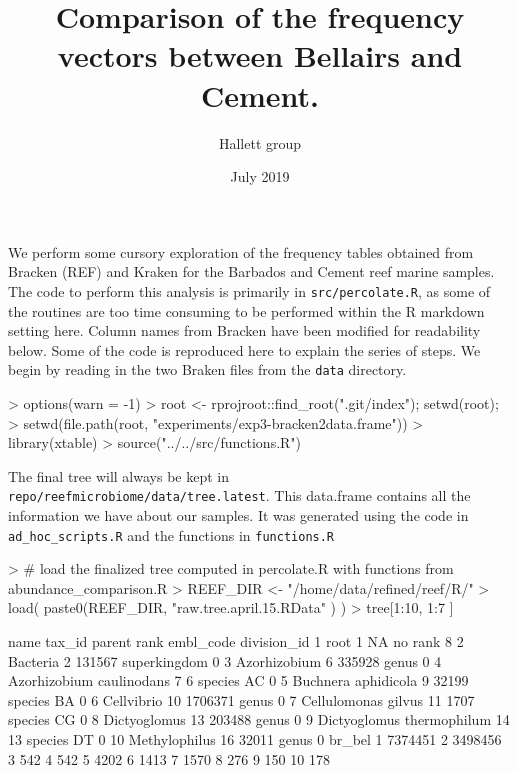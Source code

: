 \documentclass{article}
\title{Comparison of the frequency vectors between Bellairs and Cement.}
\date{July 2019}
\author{Hallett group}
\begin{document}


\maketitle

We perform some cursory exploration of the frequency tables obtained from Bracken (REF) and Kraken for 
the Barbados and Cement reef marine samples.
The code to perform this analysis is primarily in {\tt src/percolate.R}, as some of the routines
are too time consuming to be performed within the R markdown setting here.
Column names from Bracken have been modified for readability below.
Some of the code is reproduced here to explain the series of steps.
We begin by reading in the two Braken files from the {\tt data} directory.

\begin{Schunk}
\begin{Sinput}
> options(warn = -1)
> root <- rprojroot::find_root(".git/index"); setwd(root); 
> setwd(file.path(root, "experiments/exp3-bracken2data.frame"))
> library(xtable)
> source("../../src/functions.R")
\end{Sinput}
\end{Schunk}

The final tree will always be kept in\\ 
\noindent
{\tt repo/reefmicrobiome/data/tree.latest}. 
This data.frame contains all the information we have about our samples.
It was generated using the code in {\tt ad\_hoc\_scripts.R} and the functions in {\tt functions.R}
\begin{Schunk}
\begin{Sinput}
> # load the finalized tree  computed in percolate.R with functions from abundance_comparison.R
> REEF_DIR <- "/home/data/refined/reef/R/"
> load( paste0(REEF_DIR, "raw.tree.april.15.RData" ) )
> tree[1:10, 1:7 ]
\end{Sinput}
\begin{Soutput}
                        name tax_id  parent         rank embl_code division_id
1                       root      1      NA      no rank                     8
2                   Bacteria      2  131567 superkingdom                     0
3               Azorhizobium      6  335928        genus                     0
4   Azorhizobium caulinodans      7       6      species        AC           0
5        Buchnera aphidicola      9   32199      species        BA           0
6                 Cellvibrio     10 1706371        genus                     0
7        Cellulomonas gilvus     11    1707      species        CG           0
8               Dictyoglomus     13  203488        genus                     0
9  Dictyoglomus thermophilum     14      13      species        DT           0
10             Methylophilus     16   32011        genus                     0
    br_bel
1  7374451
2  3498456
3      542
4      542
5     4202
6     1413
7     1570
8      276
9      150
10     178
\end{Soutput}
\end{Schunk}
\end{document}
